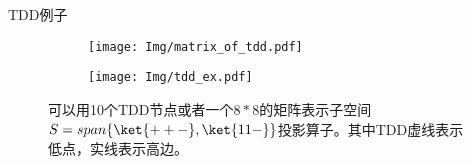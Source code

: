 \documentclass[aspectratio=1610]{ctexbeamer}
\begin{document}
\begin{frame}{TDD例子}
    \begin{figure}
        \begin{subfigure}{0.4\textwidth}
            \texttt{[image: Img/matrix\_of\_tdd.pdf]}
            \label{fig:mat_P}
        \end{subfigure}
        \qquad
        \qquad
        \qquad
        \begin{subfigure}[c]{0.4\textwidth}
            \centering
            \texttt{[image: Img/tdd\_ex.pdf]}
            \label{fig:tdd_P}
        \end{subfigure}
        \label{fig:P}
        \caption{可以用10个TDD节点或者一个$8*8$的矩阵表示子空间$S=span\{\ket{++-},\ket{11-}\}$投影算子。其中TDD虚线表示低点，实线表示高边。}
    \end{figure}
\end{frame}
        

        
\end{document}
